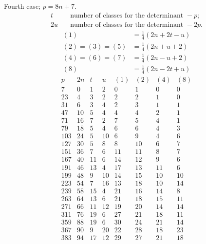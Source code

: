 \clearpage
Fourth case; $p=8n+7$.
\[
\begin{aligned}
t&\quad\text{number of classes for the determinant }-p;\\
2u&\quad\text{number of classes for the determinant }-2p.
\end{aligned}
\]
\[
\begin{aligned}
(1)&=\tfrac14(2n+2t-u)\\
(2)=(3)=(5)&=\tfrac14(2n+u+2)\\
(4)=(6)=(7)&=\tfrac14(2n-u+2)\\
(8)&=\tfrac14(2n-2t+u)
\end{aligned}
\]
\[
\begin{array}{r|r|r|r|r|r|r|r}
p&2n&t&u&(1)&(2)&(4)&(8)\\\hline
7&0&1&2&0&1&0&0\\
23&4&3&2&2&2&1&0\\
31&6&3&4&2&3&1&1\\
47&10&5&4&4&4&2&1\\
71&16&7&2&7&5&4&1\\
79&18&5&4&6&6&4&3\\
103&24&5&10&6&9&4&6\\
127&30&5&8&8&10&6&7\\
151&36&7&6&11&11&8&7\\
167&40&11&6&14&12&9&6\\
191&46&13&4&17&13&11&6\\
199&48&9&10&14&15&10&10\\
223&54&7&16&13&18&10&14\\
239&58&15&4&21&16&14&8\\
263&64&13&6&21&18&15&11\\
271&66&11&12&19&20&14&14\\
311&76&19&6&27&21&18&11\\
359&88&19&6&30&24&21&14\\
367&90&9&20&22&28&18&23\\
383&94&17&12&29&27&21&18
\end{array}
\]
